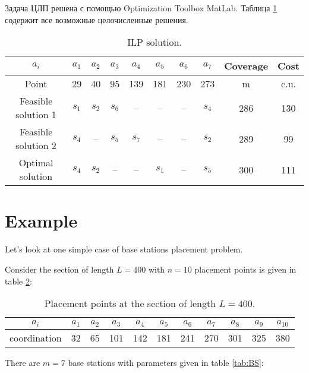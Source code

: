 Задача ЦЛП решена с помощью Optimization Toolbox MatLab. Таблица \cref{tab:part3_ilp_solution} содержит все возможные целочисленные решения.

\begin{table}[h!]\centering
  \begin{tabular}{|c||c|c|c|c|c|c|c||c|c|}\hline
    $a_i$ & $a_1$ &  $a_2$ & $a_3$ & $a_4$ & $a_5$ & $a_6$ & $a_7$  & Coverage & Cost \\ \hline 
    Point & 29 & 40 & 95 & 139 & 181 & 230 & 273 & m & c.u.\\ \hline \hline
    Feasible solution 1 & $s_1$ & $s_2$ & $s_6$ & -- & -- & -- & $s_4$ & 286 & 130\\ 
    Feasible solution 2 & $s_4$ & -- & $s_5$ & $s_7$ & -- & -- & $s_2$ & 289 & 99\\
    Optimal solution & $s_4$ & $s_2$ & -- & -- & $s_1$ & -- & $s_5$ & 300 & 111 \\ \hline
\end{tabular}\caption{ILP solution.}\label{tab:part3_ilp_solution}
\end{table}



\section{Example}

Let's look at one simple case of base stations placement problem.

Consider the section of length $L = 400$ with $n = 10$ placement points is given in table \ref{tab:placed_point}:

\begin{table}[h!]\begin{center}
  \begin{tabular}{|c||c|c|c|c|c|c|c|c|c|c|}\hline
    $a_i$ & $a_1$ &  $a_2$ & $a_3$ & $a_4$ & $a_5$ & $a_6$ & $a_7$ & $a_8$ & $a_9$ & $a_{10}$ \\ \hline \hline
    coordination & 32 & 65 & 101 & 142 & 181 & 241 & 270 & 301 & 325 & 380 \\ \hline
\end{tabular}\caption{Placement points at the section of length $L = 400$.}\label{tab:placed_point}
\end{center}\end{table}

There are $m = 7$ base stations with parameters given in table \ref{tab:BS}:


